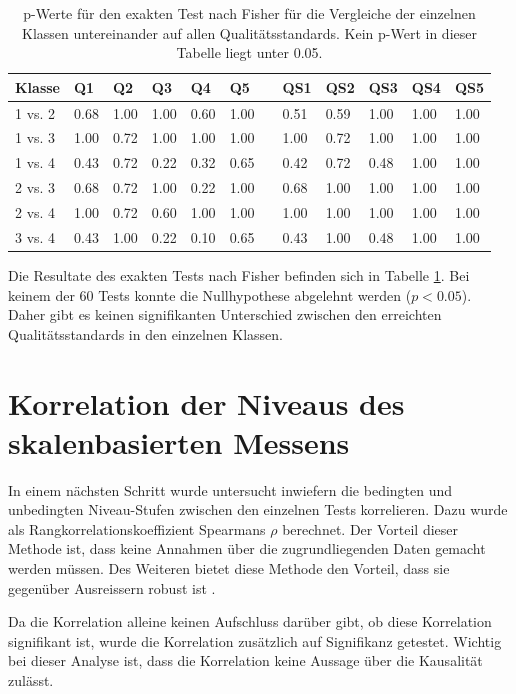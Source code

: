\begin{table}[htbp]
  \centering
\begin{tabular}{@{}llllllllllll@{}}
\toprule
 Klasse & Q1 & Q2 & Q3 & Q4 & Q5 && QS1 & QS2 & QS3 & QS4 & QS5 \\ 
\midrule
 1 vs. 2 &   0.68 & 1.00 & 1.00 & 0.60 & 1.00 && 0.51 & 0.59 & 1.00 & 1.00 & 1.00   \\ 
 1 vs. 3 &   1.00 & 0.72 & 1.00 & 1.00 & 1.00 && 1.00 & 0.72 & 1.00 & 1.00 & 1.00   \\
 1 vs. 4 &   0.43 & 0.72 & 0.22 & 0.32 & 0.65 && 0.42 & 0.72 & 0.48 & 1.00 & 1.00   \\
 2 vs. 3 &   0.68 & 0.72 & 1.00 & 0.22 & 1.00 && 0.68 & 1.00 & 1.00 & 1.00 & 1.00   \\
 2 vs. 4 &   1.00 & 0.72 & 0.60 & 1.00 & 1.00 && 1.00 & 1.00 & 1.00 & 1.00 & 1.00   \\
 3 vs. 4 &   0.43 & 1.00 & 0.22 & 0.10 & 0.65 && 0.43 & 1.00 & 0.48 & 1.00 & 1.00   \\
\bottomrule
\end{tabular} 
  \caption{p-Werte für den exakten Test nach Fisher für die Vergleiche der einzelnen Klassen untereinander auf allen Qualitätsstandards. Kein p-Wert in dieser Tabelle liegt unter 0.05. }
  \label{tab:KlassenVergleiche}
\end{table}


Die Resultate des exakten Tests nach Fisher befinden sich in Tabelle \ref{tab:KlassenVergleiche}. Bei keinem der 60 Tests konnte die Nullhypothese abgelehnt werden ($p < 0.05$). Daher gibt es keinen signifikanten Unterschied zwischen den erreichten Qualitätsstandards in den einzelnen Klassen.  

\section{Korrelation der Niveaus des skalenbasierten Messens}

In einem nächsten Schritt wurde untersucht inwiefern die bedingten und unbedingten Niveau-Stufen zwischen den einzelnen Tests korrelieren. Dazu wurde als Rangkorrelationskoeffizient Spearmans $\rho$ berechnet. Der Vorteil dieser Methode ist, dass keine Annahmen über die zugrundliegenden Daten gemacht werden müssen. Des Weiteren bietet diese Methode den Vorteil, dass sie gegenüber Ausreissern robust ist \citep{Kowalski1972}. 

Da die Korrelation alleine keinen Aufschluss darüber gibt, ob diese Korrelation signifikant ist, wurde die Korrelation zusätzlich auf Signifikanz getestet. Wichtig bei dieser Analyse ist, dass die Korrelation keine Aussage über die Kausalität zulässt.


